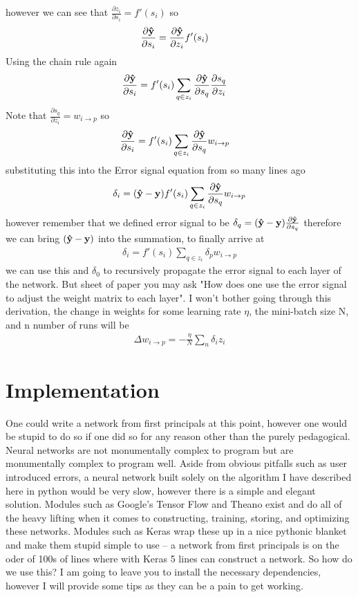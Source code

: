\documentclass[a4paper]{article}
\begin{document}
however we can see that $\frac{\partial z_{i}}{\partial s_{i}} = f'(s_{i})$ so
\begin{align*}
	\frac{\partial \vu{y}}{\partial s_{i}} &= \frac{\partial \vu{y}}{\partial z_{i}}f'(s_{i})
\end{align*}
Using the chain rule again
\begin{align*}
	\frac{\partial \vu{y}}{\partial s_{i}} &= f'(s_{i})\sum_{q\in z_{i}}\frac{\partial \vu{y}}{\partial s_{q}}\frac{\partial s_{q}}{\partial z_{i}}
\end{align*}
Note that $\frac{\partial s_{q}}{\partial z_{i}} = w_{i\rightarrow p}$ so
\begin{align*}
	\frac{\partial \vu{y}}{\partial s_{i}} &= f'(s_{i})\sum_{q\in z_{i}}\frac{\partial \vu{y}}{\partial s_{q}}w_{i\rightarrow p}
\end{align*}
substituting this into the Error signal equation from so many lines ago
\begin{align*}
	\delta_{i} = (\vu{y}-\vb{y})f'(s_{i})\sum_{q\in z_{i}}\frac{\partial \vu{y}}{\partial s_{q}}w_{i\rightarrow p}
\end{align*}
however remember that we defined error signal to be $\delta_{q} = (\vu{y}-\vb{y})\frac{\partial \vu{y}}{\partial s_{q}}$ therefore we can bring $(\vu{y}-\vb{y})$ into the summation, to finally arrive at
\begin{align}
	\delta_{i}=f'(s_{i})\sum_{q\in z_{i}}\delta_{p}w_{i\rightarrow p}
\end{align}
we can use this and $\delta_{0}$ to recursively propagate the error signal to each layer of the network. But sheet of paper you may ask "How does one use the error signal to adjust the weight matrix to each layer". I won't bother going through this derivation, the change in weights for some learning rate $\eta$, the mini-batch size N, and n number of runs will be 
\begin{align}
	\Delta w_{i\rightarrow p} = -\frac{\eta}{N}\sum_{n}\delta_{i}z_{i}
\end{align}
\section{Implementation}
One could write a network from first principals at this point, however one would be stupid to do so if one did so for any reason other than the purely pedagogical. Neural networks are not monumentally complex to program but are monumentally complex to program well. Aside from obvious pitfalls such as user introduced errors, a neural network built solely on the algorithm I have described here in python would be very slow, however there is a simple and elegant solution. Modules such as Google's Tensor Flow and Theano exist and do all of the heavy lifting when it comes to constructing, training, storing, and optimizing these networks. Modules such as Keras wrap these up in a nice pythonic blanket and make them stupid simple to use -- a network from first principals is on the oder of 100s of lines where with Keras 5 lines can construct a network. So how do we use this? I am going to leave you to install the necessary dependencies, however I will provide some tips as they can be a pain to get working.
\end{document}
